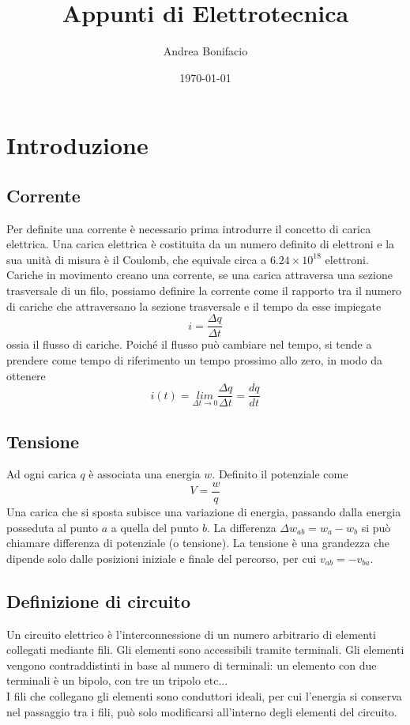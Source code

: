 \documentclass[a4paper,12pt]{article}
\begin{document}
\title{Appunti di Elettrotecnica}
\author{Andrea Bonifacio}
\date{\today}
\maketitle

\newpage

\section{Introduzione}
\subsection{Corrente}

Per definite una corrente è necessario prima introdurre il concetto di carica elettrica. Una carica elettrica è costituita da un numero definito di elettroni e la sua unità di misura è il Coulomb, che equivale circa a $6.24 \times 10^{18}$ elettroni. \\
Cariche in movimento creano una corrente, se una carica attraversa una sezione trasversale di un filo, possiamo definire la corrente come il rapporto tra il numero di cariche che attraversano la sezione trasversale e il tempo da esse impiegate
$$ i = \frac{\Delta q}{\Delta t}$$
ossia il flusso di cariche. Poiché il flusso può cambiare nel tempo, si tende a prendere come tempo di riferimento un tempo prossimo allo zero, in modo da ottenere
$$i(t) = \underset{\Delta t \rightarrow 0}{lim} \frac{\Delta q}{\Delta t} = \frac{dq}{dt}$$

\subsection{Tensione}

Ad ogni carica $q$ è associata una energia $w$. Definito il potenziale come
$$V = \frac{w}{q}$$
Una carica che si sposta subisce una variazione di energia, passando dalla energia posseduta al punto $a$ a quella del punto $b$. La differenza $\Delta w_{ab} = w_{a}- w_{b}$ si può chiamare differenza di potenziale (o tensione). La tensione è una grandezza che dipende solo dalle posizioni iniziale e finale del percorso, per cui $v_{ab} = -v_{ba}$.
\subsection{Definizione di circuito}
Un circuito elettrico è l'interconnessione di un numero arbitrario di elementi collegati mediante fili. Gli elementi sono accessibili tramite terminali. Gli elementi vengono contraddistinti in base al numero di terminali: un elemento con due terminali è un bipolo, con tre un tripolo etc...\\
I fili che collegano gli elementi sono conduttori ideali, per cui l'energia si conserva nel passaggio tra i fili, può solo modificarsi all'interno degli elementi del circuito.
\end{document}
